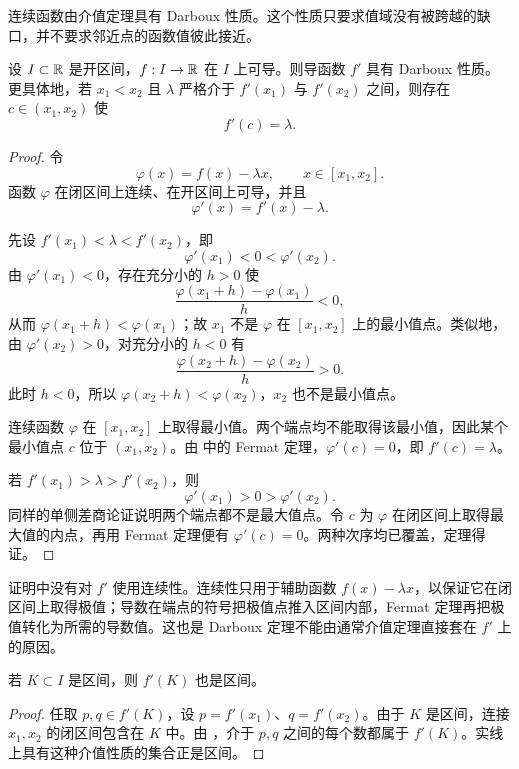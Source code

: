 连续函数由介值定理具有 Darboux 性质。这个性质只要求值域没有被跨越的缺口，并不要求邻近点的函数值彼此接近。

\begin{theorem}[Darboux 定理]
\label{thm:darboux-derivative}
设 \(I\subset\mathbb{R}\) 是开区间，\(f:I\to\mathbb{R}\) 在 \(I\) 上可导。则导函数 \(f'\) 具有 Darboux 性质。更具体地，若 \(x_1<x_2\) 且 \(\lambda\) 严格介于 \(f'(x_1)\) 与 \(f'(x_2)\) 之间，则存在 \(c\in(x_1,x_2)\) 使
\[
 f'(c)=\lambda.
\]
\end{theorem}

\begin{proof}
令
\[
 \varphi(x)=f(x)-\lambda x,
 \qquad x\in[x_1,x_2].
\]
函数 \(\varphi\) 在闭区间上连续、在开区间上可导，并且
\[
 \varphi'(x)=f'(x)-\lambda.
\]

先设 \(f'(x_1)<\lambda<f'(x_2)\)，即
\[
 \varphi'(x_1)<0<\varphi'(x_2).
\]
由 \(\varphi'(x_1)<0\)，存在充分小的 \(h>0\) 使
\[
 \frac{\varphi(x_1+h)-\varphi(x_1)}h<0,
\]
从而 \(\varphi(x_1+h)<\varphi(x_1)\)；故 \(x_1\) 不是 \(\varphi\) 在 \([x_1,x_2]\) 上的最小值点。类似地，由 \(\varphi'(x_2)>0\)，对充分小的 \(h<0\) 有
\[
 \frac{\varphi(x_2+h)-\varphi(x_2)}h>0.
\]
此时 \(h<0\)，所以 \(\varphi(x_2+h)<\varphi(x_2)\)，\(x_2\) 也不是最小值点。

连续函数 \(\varphi\) 在 \([x_1,x_2]\) 上取得最小值。两个端点均不能取得该最小值，因此某个最小值点 \(c\) 位于 \((x_1,x_2)\)。由
 中的 Fermat 定理，\(\varphi'(c)=0\)，即 \(f'(c)=\lambda\)。

若 \(f'(x_1)>\lambda>f'(x_2)\)，则
\[
 \varphi'(x_1)>0>\varphi'(x_2).
\]
同样的单侧差商论证说明两个端点都不是最大值点。令 \(c\) 为 \(\varphi\) 在闭区间上取得最大值的内点，再用 Fermat 定理便有 \(\varphi'(c)=0\)。两种次序均已覆盖，定理得证。
\end{proof}

证明中没有对 \(f'\) 使用连续性。连续性只用于辅助函数 \(f(x)-\lambda x\)，以保证它在闭区间上取得极值；导数在端点的符号把极值点推入区间内部，Fermat 定理再把极值转化为所需的导数值。这也是 Darboux 定理不能由通常介值定理直接套在 \(f'\) 上的原因。

\begin{corollary}[区间的导数像]
\label{cor:derivative-image-interval}
若 \(K\subset I\) 是区间，则 \(f'(K)\) 也是区间。
\end{corollary}

\begin{proof}
任取 \(p,q\in f'(K)\)，设 \(p=f'(x_1)\)、\(q=f'(x_2)\)。由于 \(K\) 是区间，连接 \(x_1,x_2\) 的闭区间包含在 \(K\) 中。由
，介于 \(p,q\) 之间的每个数都属于 \(f'(K)\)。实线上具有这种介值性质的集合正是区间。
\end{proof}


